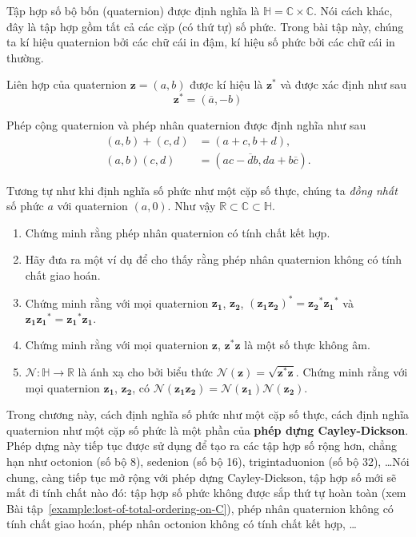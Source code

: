 \begin{exercise}[Quaternion]
	Tập hợp số bộ bốn (quaternion) được định nghĩa là $\mathbb{H} = \mathbb{C}\times\mathbb{C}$. Nói cách khác, đây là tập hợp gồm tất cả các cặp (có thứ tự) số phức. Trong bài tập này, chúng ta kí hiệu quaternion bởi các chữ cái in đậm, kí hiệu số phức bởi các chữ cái in thường.

	Liên hợp của quaternion $\mathbf{z} = (a, b)$ được kí hiệu là ${\mathbf{z}}^{*}$ và được xác định như sau
	\[
		{\mathbf{z}}^{*} = (\overline{a}, -b)
	\]

	Phép cộng quaternion và phép nhân quaternion được định nghĩa như sau
	\begin{align*}
		(a, b) + (c, d) & = (a+c, b+d), \\
		(a,b)(c,d) & = (ac - \overline{d}b, da + b\overline{c}).
	\end{align*}

	Tương tự như khi định nghĩa số phức như một cặp số thực, chúng ta \textit{đồng nhất} số phức $a$ với quaternion $(a, 0)$. Như vậy $\mathbb{R}\subset \mathbb{C}\subset \mathbb{H}$.

	\begin{enumerate}[label={(\roman*)}]
		\item Chứng minh rằng phép nhân quaternion có tính chất kết hợp.
		\item Hãy đưa ra một ví dụ để cho thấy rằng phép nhân quaternion không có tính chất giao hoán.
		\item Chứng minh rằng với mọi quaternion $\mathbf{z_{1}}$, $\mathbf{z_{2}}$, ${(\mathbf{z_{1}}{\mathbf{z_{2}}})}^{*} = {\mathbf{z_{2}}}^{*}{\mathbf{z_{1}}}^{*}$ và $\mathbf{z_{1}}\mathbf{z_{1}}^{*} = \mathbf{z_{1}}^{*}\mathbf{z_{1}}$.
		\item Chứng minh rằng với mọi quaternion $\mathbf{z}$, $\mathbf{z}^{*}\mathbf{z}$ là một số thực không âm.
		\item $\mathcal{N}: \mathbb{H}\to \mathbb{R}$ là ánh xạ cho bởi biểu thức $\mathcal{N}(\mathbf{z}) = \sqrt{\mathbf{z}^{*}\mathbf{z}}$. Chứng minh rằng với mọi quaternion $\mathbf{z_{1}}$, $\mathbf{z_{2}}$, có $\mathcal{N}(\mathbf{z_{1}}\mathbf{z_{2}}) = \mathcal{N}(\mathbf{z_{1}})\mathcal{N}(\mathbf{z_{2}})$.
	\end{enumerate}
\end{exercise}

Trong chương này, cách định nghĩa số phức như một cặp số thực, cách định nghĩa quaternion như một cặp số phức là một phần của \textbf{phép dựng Cayley-Dickson}. Phép dựng này tiếp tục được sử dụng để tạo ra các tập hợp số rộng hơn, chẳng hạn như octonion (số bộ 8), sedenion (số bộ 16), trigintaduonion (số bộ 32), \ldots Nói chung, càng tiếp tục mở rộng với phép dựng Cayley-Dickson, tập hợp số mới sẽ mất đi tính chất nào đó: tập hợp số phức không được sắp thứ tự hoàn toàn (xem Bài tập~\ref{example:lost-of-total-ordering-on-C}), phép nhân quaternion không có tính chất giao hoán, phép nhân octonion không có tính chất kết hợp, \ldots
